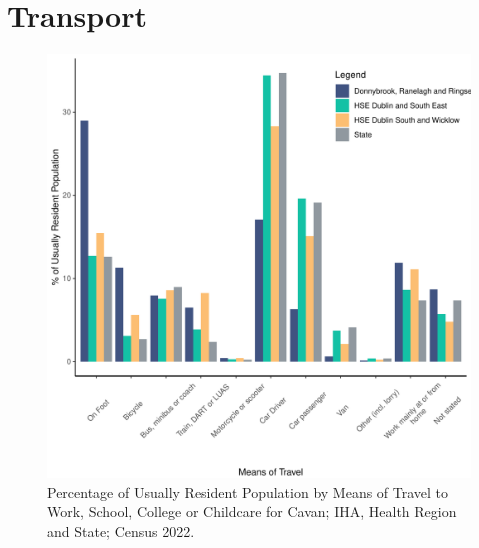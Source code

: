 \documentclass{article}
\begin{document}
\section{Transport}\label{sect:Trans}
\begin{figure}[H]
	\centering
	\includegraphics[width = 120mm]{../figures/TravelED.pdf}
	\caption{Percentage of Usually Resident Population by Means of Travel to Work, School, College or Childcare for Cavan; IHA, Health Region and State; Census 2022.}
	\label{fig:vbnv}
	\end{figure}
\end{document}
